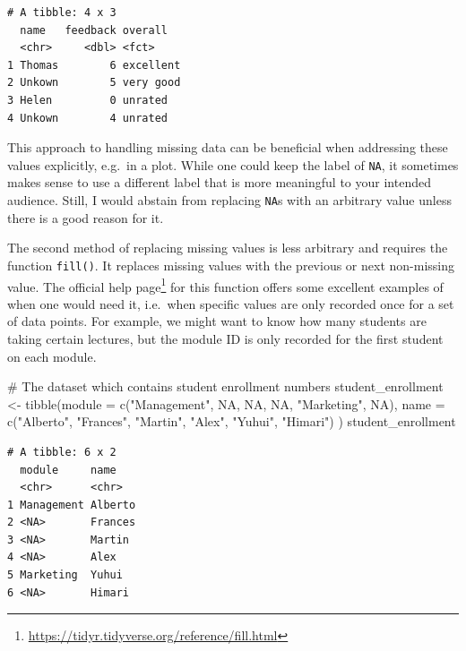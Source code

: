 \documentclass[
  letterpaper,
]{krantz}
\makeatletter
\newenvironment{Shaded}{\begin{snugshade}}{\end{snugshade}}
\newcommand{\AttributeTok}[1]{\textcolor[rgb]{0.40,0.45,0.13}{#1}}
\newcommand{\CommentTok}[1]{\textcolor[rgb]{0.37,0.37,0.37}{#1}}
\newcommand{\ConstantTok}[1]{\textcolor[rgb]{0.56,0.35,0.01}{#1}}
\newcommand{\FunctionTok}[1]{\textcolor[rgb]{0.28,0.35,0.67}{#1}}
\newcommand{\NormalTok}[1]{\textcolor[rgb]{0.00,0.23,0.31}{#1}}
\newcommand{\OtherTok}[1]{\textcolor[rgb]{0.00,0.23,0.31}{#1}}
\newcommand{\StringTok}[1]{\textcolor[rgb]{0.13,0.47,0.30}{#1}}
\renewcommand{\href}[2]{#2\footnote{\url{#1}}}
\newenvironment{kframe}{%
\medskip{}
\setlength{\fboxsep}{.8em}
 \def\at@end@of@kframe{}%
 \ifinner\ifhmode%
  \def\at@end@of@kframe{\end{minipage}}%
  \begin{minipage}{\columnwidth}%
 \fi\fi%
 \def\FrameCommand##1{\hskip\@totalleftmargin \hskip-\fboxsep
 \colorbox{shadecolor}{##1}\hskip-\fboxsep
     \hskip-\linewidth \hskip-\@totalleftmargin \hskip\columnwidth}%
 \MakeFramed {\advance\hsize-\width
   \@totalleftmargin\z@ \linewidth\hsize
   \@setminipage}}%
 {\par\unskip\endMakeFramed%
 \at@end@of@kframe}
\renewenvironment{Shaded}{\begin{kframe}}{\end{kframe}}
\makeatother
\begin{document}
\begin{verbatim}
# A tibble: 4 x 3
  name   feedback overall  
  <chr>     <dbl> <fct>    
1 Thomas        6 excellent
2 Unkown        5 very good
3 Helen         0 unrated  
4 Unkown        4 unrated  
\end{verbatim}

This approach to handling missing data can be beneficial when addressing
these values explicitly, e.g.~in a plot. While one could keep the label
of \texttt{NA}, it sometimes makes sense to use a different label that
is more meaningful to your intended audience. Still, I would abstain
from replacing \texttt{NA}s with an arbitrary value unless there is a
good reason for it.

The second method of replacing missing values is less arbitrary and
requires the function \texttt{fill()}. It replaces missing values with
the previous or next non-missing value. The
\href{https://tidyr.tidyverse.org/reference/fill.html}{official help
page} for this function offers some excellent examples of when one would
need it, i.e.~when specific values are only recorded once for a set of
data points. For example, we might want to know how many students are
taking certain lectures, but the module ID is only recorded for the
first student on each module.

\begin{Shaded}
\begin{Highlighting}[]
\CommentTok{\# The dataset which contains student enrollment numbers}
\NormalTok{student\_enrollment }\OtherTok{\textless{}{-}} \FunctionTok{tibble}\NormalTok{(}\AttributeTok{module =} \FunctionTok{c}\NormalTok{(}\StringTok{"Management"}\NormalTok{, }\ConstantTok{NA}\NormalTok{, }\ConstantTok{NA}\NormalTok{,}
                                        \ConstantTok{NA}\NormalTok{, }\StringTok{"Marketing"}\NormalTok{, }\ConstantTok{NA}\NormalTok{),}
                             \AttributeTok{name =} \FunctionTok{c}\NormalTok{(}\StringTok{"Alberto"}\NormalTok{, }\StringTok{"Frances"}\NormalTok{, }\StringTok{"Martin"}\NormalTok{,}
                                    \StringTok{"Alex"}\NormalTok{, }\StringTok{"Yuhui"}\NormalTok{, }\StringTok{"Himari"}\NormalTok{)}
\NormalTok{                             )}
\NormalTok{student\_enrollment}
\end{Highlighting}
\end{Shaded}

\begin{verbatim}
# A tibble: 6 x 2
  module     name   
  <chr>      <chr>  
1 Management Alberto
2 <NA>       Frances
3 <NA>       Martin 
4 <NA>       Alex   
5 Marketing  Yuhui  
6 <NA>       Himari 
\end{verbatim}
\end{document}
